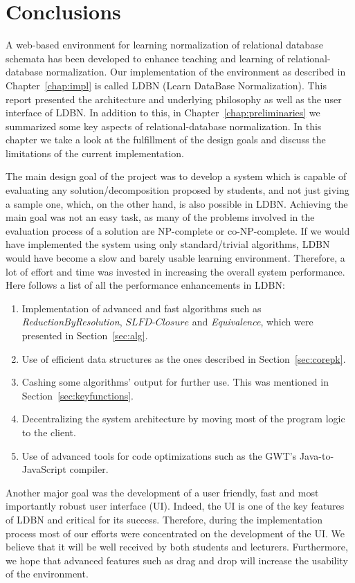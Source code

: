 \chapter{Conclusions}
\label{chap:conclusion}
A web-based environment for learning normalization of relational database schemata has been developed to
enhance teaching and learning of relational-database normalization. Our implementation of the 
environment as described in Chapter~\ref{chap:impl} is called LDBN (Learn DataBase Normalization). 
This report presented the architecture and underlying philosophy as well as the user interface of LDBN. 
In addition to this, in Chapter~\ref{chap:preliminaries}
we summarized some key aspects of relational-database normalization. 
In this chapter we take a look at the fulfillment of the design goals and discuss the limitations of 
the current implementation.

The main design goal of the project was to develop a system which is capable of evaluating any 
solution/decomposition
proposed by students, and not just giving a sample one, which, on the other hand, is also possible
in LDBN. Achieving the main goal was not an easy task, as many of the problems involved
in the evaluation process of a solution are NP-complete or co-NP-complete. 
If we would have implemented the system using only standard/trivial algorithms, LDBN
would have become a slow and barely usable learning environment. Therefore,
a lot of effort and time was invested in increasing the overall system performance. Here follows a list
of all the performance enhancements in LDBN:
\begin{enumerate}
  \item Implementation of advanced and fast algorithms such as 
    \textit{ReductionByResolution}, $SLFD$-$Closure$ and \textit{Equivalence}, which were presented in Section~\ref{sec:alg}.
  \item Use of efficient data structures as the ones described in Section~\ref{sec:corepk}.
  \item Cashing some algorithms' output for further use. This was mentioned in Section~\ref{sec:keyfunctions}. 
  \item Decentralizing the system architecture by moving most of the program logic to the client.
  \item Use of advanced tools for code optimizations such as the GWT's Java-to-JavaScript compiler.   
\end{enumerate}

Another major goal was the
development of a user friendly, fast and most importantly robust
user interface (UI). Indeed, the UI is one of the key features of LDBN and critical for its
success. Therefore, during the implementation process 
most of our efforts were concentrated on the development of the UI. We believe that it will be well received 
by both students and lecturers.
Furthermore, we hope that advanced features such as drag and drop will 
increase the usability of the environment.

